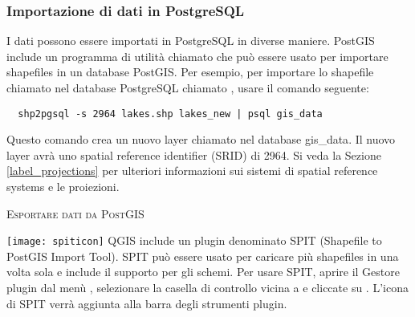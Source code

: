 \subsubsection{Importazione di dati in PostgreSQL}\label{sec:loading_postgis_data}

I dati possono essere importati in PostgreSQL in diverse maniere. PostGIS
include un programma di utilità chiamato  che può essere
usato per importare shapefiles in un database PostGIS. Per esempio, per
importare lo shapefile chiamato 
nel database PostgreSQL chiamato , usare il comando
seguente:

\begin{verbatim} 
  shp2pgsql -s 2964 lakes.shp lakes_new | psql gis_data
\end{verbatim}

Questo comando crea un nuovo layer chiamato  nel database
{gis\_data}. Il nuovo layer avrà uno spatial reference identifier (SRID) di
2964. Si veda la Sezione \ref{label_projections} per ulteriori informazioni
sui sistemi di spatial reference systems e le proiezioni.
\begin{Tip}
\caption{\textsc{Esportare dati da PostGIS}}
\end{Tip}

\texttt{[image: spiticon]} QGIS include un plugin denominato SPIT (Shapefile to PostGIS Import Tool).
SPIT può essere usato per caricare più shapefiles in una volta sola e
include il supporto per gli schemi. Per usare SPIT, aprire il Gestore plugin
dal menù , selezionare la casella di controllo vicina a
 e cliccate su . L'icona di SPIT verrà aggiunta alla
barra degli strumenti plugin. 

